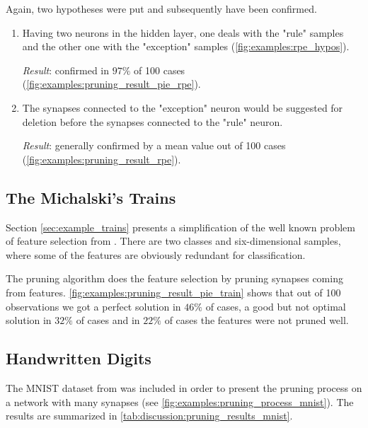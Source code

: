 Again, two hypotheses were put and subsequently have been confirmed.

\begin{enumerate}
\item Having two neurons in the hidden layer, one deals with the "rule" samples and the other one with the "exception" samples (\cref{fig:examples:rpe_hypos}).

\textit{Result}: confirmed in $ 97\% $ of 100 cases (\cref{fig:examples:pruning_result_pie_rpe}).

\item The synapses connected to the "exception" neuron would be suggested for deletion before the synapses connected to the "rule" neuron.

\textit{Result}: generally confirmed by a mean value out of 100 cases (\cref{fig:examples:pruning_result_rpe}).
\end{enumerate}

\subsection*{The Michalski's Trains}
Section \ref{sec:example_trains} presents a simplification of the well known problem of feature selection from \citep{michalski:trains}. There are two classes and six-dimensional samples, where some of the features are obviously redundant for classification.

The pruning algorithm does the feature selection by pruning synapses coming from features. \cref{fig:examples:pruning_result_pie_train} shows that out of 100 observations we got a perfect solution in $ 46\% $ of cases, a good but not optimal solution in $ 32\% $ of cases and in $ 22\% $ of cases the features were not pruned well.

\subsection*{Handwritten Digits}
The MNIST dataset from \citep{lecun:mnist} was included in order to present the pruning process on a network with many synapses (see \cref{fig:examples:pruning_process_mnist}). The results are summarized in \cref{tab:discussion:pruning_results_mnist}.

